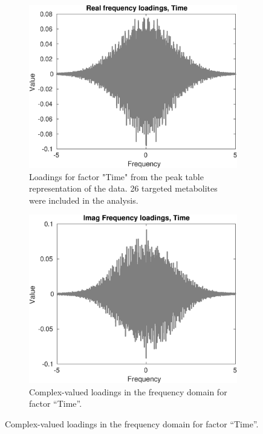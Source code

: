 \documentclass[preprint,12pt]{elsarticle}
\begin{document}
\begin{figure}[hbtp!]
    \vfill
    
    \begin{subfigure}[b]{0.45\textwidth}
        \centering
        \includegraphics[width=\textwidth]{freq_loads_time_real.eps}
        \caption{Loadings for factor "Time" from the peak table representation of the data. 26 targeted metabolites were included in the analysis.}
        \label{fig:figure3}
    \end{subfigure}
    \hfill
    \begin{subfigure}[b]{0.45\textwidth}
        \centering
        \includegraphics[width=\textwidth]{freq_loads_time_imag.eps}
        \caption{Complex-valued loadings in the frequency domain for factor ``Time''.}
        \label{fig:figure4}
    \end{subfigure}
    \vfill


\end{figure}
\end{document}
